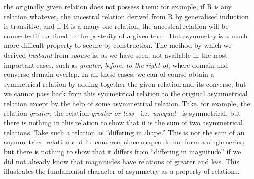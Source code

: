 {the originally given relation does not possess them: for example, if R
is any relation whatever, the ancestral relation derived from R by
generalised induction is transitive; and if R is a many-one relation,
the ancestral relation will be connected if confined to the posterity
of a given term. But asymmetry is a much more difficult property to
secure by construction. The method by which we derived \textit{husband} from
\textit{spouse}
is,
as we have seen, not available in the most important cases,
such as \textit{greater},
\textit{before},
\textit{to the right of},
where domain and converse
domain overlap. In all these cases, we can of course obtain a
symmetrical
relation by
adding together the given relation and its converse, but we cannot pass
back from this symmetrical relation to the original asymmetrical
relation except by the help of some asymmetrical   relation. Take, for
example, the relation \textit{greater}:
the relation \textit{greater or
less}---i.e.\ \textit{unequal}---is
symmetrical, but there is nothing in this relation to show
that it is the sum of two asymmetrical relations. Take such a relation
as ``differing in shape.'' This is not the sum of an asymmetrical
relation and its converse, since shapes do not form a single series;
but there is nothing to show that it differs from ``differing in
magnitude'' if we did not already know that magnitudes have relations of
greater and less. This illustrates the fundamental character of
asymmetry as a property of relations.\aftonly{\enlargethispage{\baselineskip}}

}

